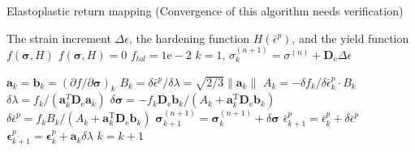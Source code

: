 \documentclass{article}
\begin{document}
	\begin{algorithm}	
	\begin{algorithmic}[1]
		\caption{Elastoplastic return mapping (Convergence of this algorithm needs verification)}
		\Require The strain increment $\Delta \epsilon$, the hardening function $H(\bar{\epsilon}^{p})$, and the yield function $f(\boldsymbol{\sigma}, H)$
		\Ensure  $f(\boldsymbol{\sigma}, H) = 0$	
		\State $f_{tol} = 1\mathrm{e}-2$	
		\State  $k=1$, $\sigma^{(n+1)}_{k}=\sigma^{(n)}+\mathbf{D}_{\mathrm{e}}\Delta\epsilon$ 
		
		  
			\State $\mathbf{a}_{k}=\mathbf{b}_{k}= \left(\partial f / \partial \boldsymbol{\sigma} \right)_k $
			\State $B_{k} =\delta \bar{\epsilon}^p /\delta \lambda=\sqrt{2/3}\|\mathbf{a}_{k} \|$
			\State $A_{k}=-\delta f_k /\delta \bar{\epsilon}_{k}^{p} \cdot B_{k}$
			\State $\delta \lambda =f_k / (\mathbf{a}_{k}^T \mathbf{D}_{\mathrm{e}} \mathbf{a}_{k}) $
			\State $\delta \boldsymbol{\sigma}=-f_{k} \mathbf{D}_{\mathrm{e}} \mathbf{b}_{k} /\left(A_{k}+\mathbf{a}_{k}^{\mathrm{T}} \mathbf{D}_{\mathrm{e}} \mathbf{b}_{k}\right)$
			\State $\delta \bar{\epsilon}^p=f_{k} B_{k} /\left(A_{k}+\mathbf{a}_{k}^{\mathrm{T}} \mathbf{D}_{\mathrm{e}} \mathbf{b}_{k}\right)$
			\State $\boldsymbol{\sigma}^{(n+1)}_{k+1}=\boldsymbol{\sigma}^{(n+1)}_{k}+\delta \boldsymbol{\sigma}$
			\State $\bar{\epsilon}_{k+1}^{p}=\bar{\epsilon}_{k}^{p}+\delta \bar{\epsilon}^p$
			\State $ \boldsymbol{\epsilon}_{k+1}^{p} = \boldsymbol{\epsilon}_{k}^{p} + \mathbf{a}_{k} \delta \lambda $
			\State $k=k+1$
		\EndWhile
		\State {} 
	\end{algorithmic}
\end{algorithm}

\end{document}
